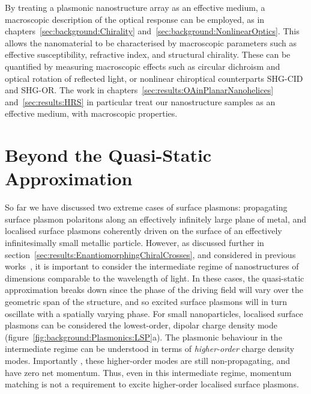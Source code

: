 By treating a plasmonic nanostructure array as an effective medium, a macroscopic description of the optical response can be employed, as in chapters~\ref{sec:background:Chirality} and~\ref{sec:background:NonlinearOptics}. This allows the nanomaterial to be characterised by macroscopic parameters such as effective susceptibility, refractive index, and structural chirality. These can be quantified by measuring macroscopic effects such as circular dichroism and optical rotation of reflected light, or nonlinear chiroptical counterparts SHG-CID and SHG-OR. The work in chapters~\ref{sec:results:OAinPlanarNanohelices} and~\ref{sec:results:HRS} in particular treat our nanostructure samples as an effective medium, with macroscopic properties.

\section{Beyond the Quasi-Static Approximation}\label{sec:background:Plasmonics:Intermediate}
So far we have discussed two extreme cases of surface plasmons: propagating surface plasmon polaritons along an effectively infinitely large plane of metal, and localised surface plasmons coherently driven on the surface of an effectively infinitesimally small metallic particle. However, as discussed further in section~\ref{sec:results:EnantiomorphingChiralCrosses}, and considered in previous works~\cite{Valev2011b, Valev2014}, it is important to consider the intermediate regime of nanostructures of dimensions comparable to the wavelength of light. In these cases, the quasi-static approximation breaks down since the phase of the driving field will vary over the geometric span of the structure, and so excited surface plasmons will in turn oscillate with a spatially varying phase. For small nanoparticles, localised surface plasmons can be considered the lowest-order, dipolar charge density mode (figure~\ref{fig:background:Plasmonics:LSP}a). The plasmonic behaviour in the intermediate regime can be understood in terms of \textit{higher-order} charge density modes. Importantly , these higher-order modes are still non-propagating, and have zero net momentum. Thus, even in this intermediate regime, momentum matching is not a requirement to excite higher-order localised surface plasmons.
